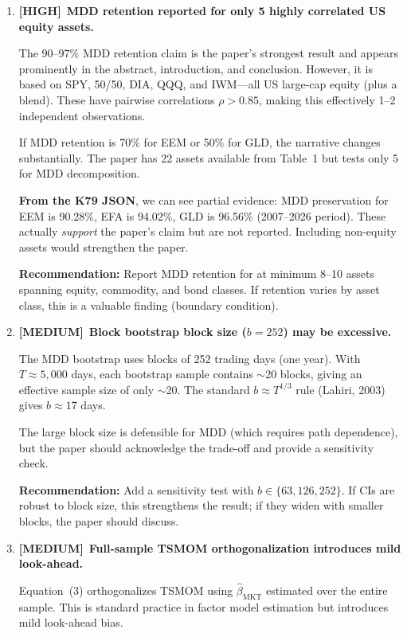 \documentclass[12pt,a4paper]{article}
\newcommand{\HIGH}{\textcolor{highsev}{\textbf{[HIGH]}}}
\newcommand{\MEDIUM}{\textcolor{medsev}{\textbf{[MEDIUM]}}}
\begin{document}
\begin{enumerate}[label=\textbf{C.\arabic*}]

\item \HIGH\ \textbf{MDD retention reported for only 5 highly correlated US equity assets.}

The 90--97\% MDD retention claim is the paper's strongest result and appears prominently in the abstract, introduction, and conclusion. However, it is based on SPY, 50/50, DIA, QQQ, and IWM---all US large-cap equity (plus a blend). These have pairwise correlations $\rho > 0.85$, making this effectively 1--2 independent observations.

If MDD retention is 70\% for EEM or 50\% for GLD, the narrative changes substantially. The paper has 22 assets available from Table~1 but tests only 5 for MDD decomposition.

\textbf{From the K79 JSON}, we can see partial evidence: MDD preservation for EEM is 90.28\%, EFA is 94.02\%, GLD is 96.56\% (2007--2026 period). These actually \textit{support} the paper's claim but are not reported. Including non-equity assets would strengthen the paper.

\textbf{Recommendation:} Report MDD retention for at minimum 8--10 assets spanning equity, commodity, and bond classes. If retention varies by asset class, this is a valuable finding (boundary condition).


\item \MEDIUM\ \textbf{Block bootstrap block size ($b = 252$) may be excessive.}

The MDD bootstrap uses blocks of 252 trading days (one year). With $T \approx 5{,}000$ days, each bootstrap sample contains $\sim$20 blocks, giving an effective sample size of only $\sim$20. The standard $b \approx T^{1/3}$ rule (Lahiri, 2003) gives $b \approx 17$ days.

The large block size is defensible for MDD (which requires path dependence), but the paper should acknowledge the trade-off and provide a sensitivity check.

\textbf{Recommendation:} Add a sensitivity test with $b \in \{63, 126, 252\}$. If CIs are robust to block size, this strengthens the result; if they widen with smaller blocks, the paper should discuss.


\item \MEDIUM\ \textbf{Full-sample TSMOM orthogonalization introduces mild look-ahead.}

Equation~(3) orthogonalizes TSMOM using $\hat{\beta}_\text{MKT}$ estimated over the entire sample. This is standard practice in factor model estimation but introduces mild look-ahead bias.


\end{enumerate}
\end{document}
